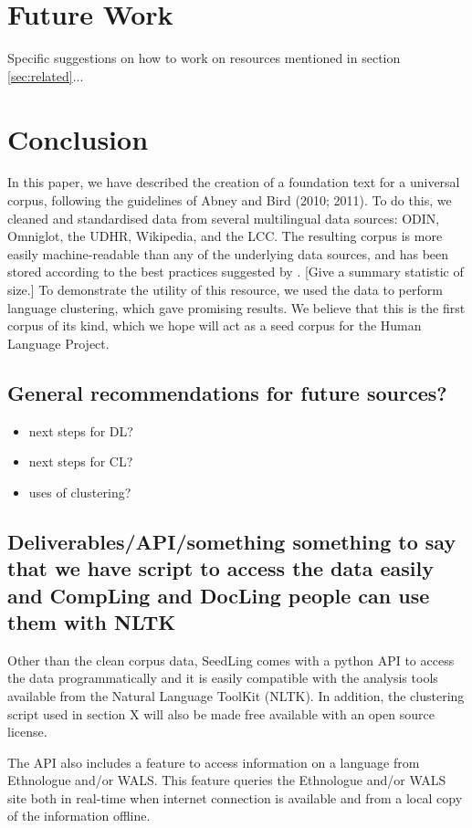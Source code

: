 
\section{Future Work} \label{sec:future}

Specific suggestions on how to work on resources mentioned in section \ref{sec:related}...


\section{Conclusion} \label{sec:conclusion}

In this paper, we have described the creation of a foundation text for a universal corpus, following the guidelines of Abney and Bird (2010; 2011). To do this, we cleaned and standardised data from several multilingual data sources: ODIN, Omniglot, the UDHR, Wikipedia, and the LCC. The resulting corpus is more easily machine-readable than any of the underlying data sources, and has been stored according to the best practices suggested by . [Give a summary statistic of size.] To demonstrate the utility of this resource, we used the data to perform language clustering, which gave promising results. We believe that this is the first corpus of its kind, which we hope will act as a seed corpus for the Human Language Project.



\subsection{General recommendations for future sources?}

\begin{itemize}
\item next steps for DL?
\item next steps for CL?
\item uses of clustering?
\end{itemize}


\subsection{Deliverables/API/something something to say that we have script to access the data easily and CompLing and DocLing people can use them with NLTK}
Other than the clean corpus data, SeedLing comes with a python API to access the data programmatically and it is easily compatible with the analysis tools available from the Natural Language ToolKit (NLTK). In addition, the clustering script used in section X will also be made free available with an open source license.

The API also includes a feature to access information on a language from Ethnologue and/or WALS. This feature queries the Ethnologue and/or WALS site both in real-time when internet connection is available and from a local copy of the information offline. 
